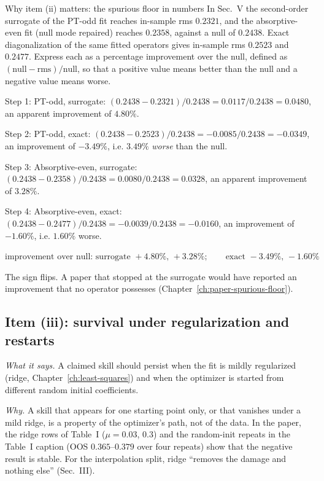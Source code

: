 \begin{sample}{Why item (ii) matters: the spurious floor in numbers}
In Sec.~V the second-order surrogate of the PT-odd fit reaches in-sample rms $0.2321$, and the absorptive-even fit (null mode repaired) reaches $0.2358$, against a null of $0.2438$. Exact diagonalization of the same fitted operators gives in-sample rms $0.2523$ and $0.2477$. Express each as a percentage improvement over the null, defined as $(\text{null}-\text{rms})/\text{null}$, so that a positive value means better than the null and a negative value means worse.

Step 1: PT-odd, surrogate: $(0.2438-0.2321)/0.2438=0.0117/0.2438=0.0480$, an apparent improvement of $4.80\%$.

Step 2: PT-odd, exact: $(0.2438-0.2523)/0.2438=-0.0085/0.2438=-0.0349$, an improvement of $-3.49\%$, i.e. $3.49\%$ \emph{worse} than the null.

Step 3: Absorptive-even, surrogate: $(0.2438-0.2358)/0.2438=0.0080/0.2438=0.0328$, an apparent improvement of $3.28\%$.

Step 4: Absorptive-even, exact: $(0.2438-0.2477)/0.2438=-0.0039/0.2438=-0.0160$, an improvement of $-1.60\%$, i.e. $1.60\%$ worse.

$\boxed{\text{improvement over null: surrogate }+4.80\%,\,+3.28\%;\qquad \text{exact }-3.49\%,\,-1.60\%}$

The sign flips. A paper that stopped at the surrogate would have reported an improvement that no operator possesses (Chapter~\ref{ch:paper-spurious-floor}).
\end{sample}

\subsection{Item (iii): survival under regularization and restarts}

\emph{What it says.} A claimed skill should persist when the fit is mildly regularized (ridge, Chapter~\ref{ch:least-squares}) and when the optimizer is started from different random initial coefficients.

\emph{Why.} A skill that appears for one starting point only, or that vanishes under a mild ridge, is a property of the optimizer's path, not of the data. In the paper, the ridge rows of Table~I ($\mu=0.03$, $0.3$) and the random-init repeats in the Table~I caption (OOS $0.365$--$0.379$ over four repeats) show that the negative result is stable. For the interpolation split, ridge ``removes the damage and nothing else'' (Sec.~III).

